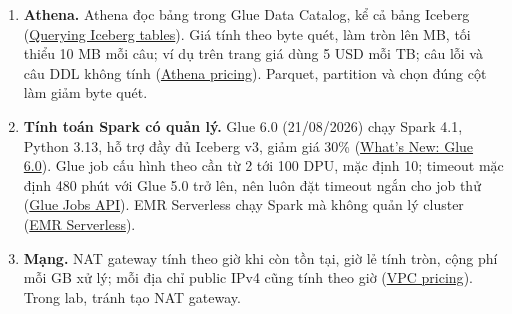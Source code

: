 \begin{enumerate}[resume]
  \item \textbf{Athena.} Athena đọc bảng trong Glue Data Catalog, kể cả bảng Iceberg (\href{https://docs.aws.amazon.com/athena/latest/ug/querying-iceberg.html}{Querying Iceberg tables}). Giá tính theo byte quét, làm tròn lên MB, tối thiểu 10 MB mỗi câu; ví dụ trên trang giá dùng 5 USD mỗi TB; câu lỗi và câu DDL không tính (\href{https://aws.amazon.com/athena/pricing/}{Athena pricing}). Parquet, partition và chọn đúng cột làm giảm byte quét.
  \item \textbf{Tính toán Spark có quản lý.} Glue 6.0 (21/08/2026) chạy Spark 4.1, Python 3.13, hỗ trợ đầy đủ Iceberg v3, giảm giá 30\% (\href{https://aws.amazon.com/about-aws/whats-new/2026/08/aws-glue-6-0-price-reduction-iceberg-v3/}{What's New: Glue 6.0}). Glue job cấu hình theo  cần từ 2 tới 100 DPU, mặc định 10; timeout mặc định 480 phút với Glue 5.0 trở lên, nên luôn đặt timeout ngắn cho job thử (\href{https://docs.aws.amazon.com/glue/latest/dg/aws-glue-api-jobs-job.html}{Glue Jobs API}). EMR Serverless chạy Spark mà không quản lý cluster (\href{https://docs.aws.amazon.com/emr/latest/EMR-Serverless-UserGuide/getting-started.html}{EMR Serverless}).
  \item \textbf{Mạng.} NAT gateway tính theo giờ khi còn tồn tại, giờ lẻ tính tròn, cộng phí mỗi GB xử lý; mỗi địa chỉ public IPv4 cũng tính theo giờ (\href{https://aws.amazon.com/vpc/pricing/}{VPC pricing}). Trong lab, tránh tạo NAT gateway.
\end{enumerate}

